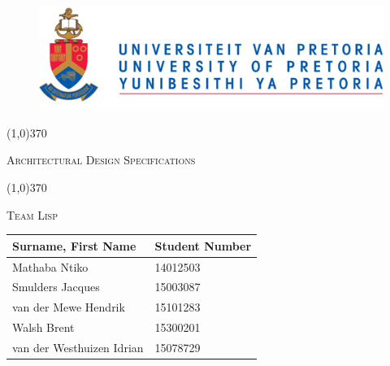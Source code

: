 \documentclass[english]{article}
\begin{document}
	
	\begin{figure}
		\includegraphics[width=\linewidth]{up_logo.png}
	\end{figure}
	
	\begin{center}
	 \line(1,0){370}
	\\[0.2cm]
    {\scshape\Large Architectural Design Specifications  \par}
	\vspace{0.1cm}
	\line(1,0){370}
	\\[0.8cm]
	
	 {\scshape\Large Team Lisp \par}
	\vspace{0.9cm}
	
	\begin{tabu} to \textwidth { X[l] X[l]}
		\hline
		\textbf{Surname, First Name  }	& \textbf{Student Number}	\\ \hline \hline
		Mathaba	Ntiko   &14012503	\\ \hline
		Smulders	Jacques  &15003087		\\ \hline
		van der Mewe	Hendrik   &15101283		\\ \hline
		Walsh     Brent    &15300201		\\ \hline
		van der Westhuizen	Idrian    &15078729		\\ \hline
		\hline
	\end{tabu}
	
	\end{center}
	
	
	\newpage
	\tableofcontents

	\newpage
		
\end{document}
